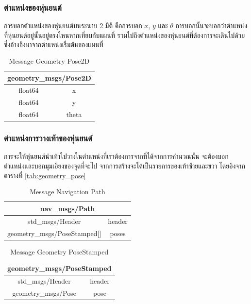 \clearpage
\subsubsection*{ตำแหน่งของหุ่นยนต์}
การบอกตำแหน่งของหุ่นยนต์บนระนาบ 2 มิติ คือการบอก $x$, $y$ และ $\theta$
การบอกนั้นจะบอกว่าตำแหน่งที่หุ่นยนต์อยู่นั้นอยู่ตรงไหนหากเที่ยบกับแผนที่
รวมไปถึงตำแหน่งของหุ่นยนต์ที่ต้องการจะเดินไปด้วย ซึ่งอ้างอิงมาจากตำแหน่งเริ่มต้นของแผนที่ 
\begin{table}[h!]
	\centering
	\begin{tabular}{| c | c |}
		\hline
		\multicolumn{2}{|c|}{geometry\_msgs/Pose2D}\\
		\hline
		float64 & x \\
		float64 & y \\
		float64 & theta \\
		\hline
	\end{tabular}
	\caption{Message Geometry Pose2D}
	\label{tab:geometry_pose2d}
\end{table}

\subsubsection*{ตำแหน่งการวางเท้าของหุ่นยนต์}
การจะให้หุ่นยนต์นำเท้าไปวางในตำแหน่งที่เราต้องการจากที่ได้จากการคำนวณนั้น
จะต้องบอกตำแหน่งและบอกมุมเอียงของจุดที่จะไป จากการสร้างจะได้เป็นรายการของเท้าซ้ายและขวา
โดยอิงจาก ตารางที่ \ref{tab:geometry_pose}
\begin{table}[h!]
	\centering
	\begin{tabular}{| c | c |}
		\hline
		\multicolumn{2}{|c|}{nav\_msgs/Path}\\
		\hline
		std\_msgs/Header & header \\
		geometry\_msgs/PoseStamped[] & poses \\
		\hline
	\end{tabular}
	\caption{Message Navigation Path}
	\label{tab:nav_path}
\end{table}
\begin{table}[h!]
	\centering
	\begin{tabular}{| c | c |}
		\hline
		\multicolumn{2}{|c|}{geometry\_msgs/PoseStamped}\\
		\hline
		std\_msgs/Header & header \\
		geometry\_msgs/Pose & pose \\
		\hline
	\end{tabular}
	\caption{Message Geometry PoseStamped}
	\label{tab:geometry_posestamped}
\end{table}

